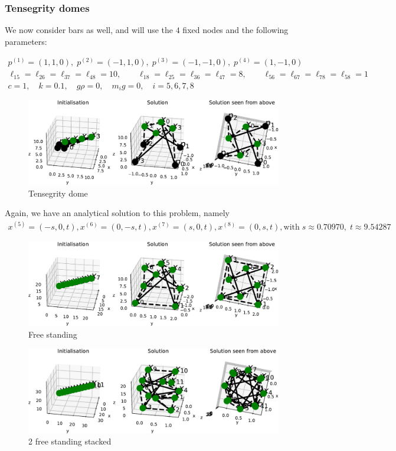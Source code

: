 \subsubsection{Tensegrity domes}
We now consider bars as well, and will use the $4$ fixed nodes and the following parameters:

\begin{equation*}
    \begin{gathered}
    p^{(1)} = (1,1,0),\; p^{(2)} = (-1,1,0),\; p^{(3)} = (-1,-1,0),\; p^{(4)} = (1,-1,0)\\
    \ell_{15} = \ell_{26} = \ell_{37} = \ell_{48} = 10, \qquad \ell_{18} = \ell_{25} = \ell_{36} = \ell_{47} = 8, \qquad \ell_{56} = \ell_{67} = \ell_{78} = \ell_{58} = 1\\
    c=1, \quad k= 0.1, \quad g \rho = 0,\quad m_i g = 0, \quad i = 5,6,7,8
    \end{gathered}
\end{equation*}

\begin{figure}
    \centering
    \includegraphics[width=1\columnwidth]{Bilder/P69.pdf}
    \caption{Tensegrity dome}
    \label{P69}
\end{figure}
Again, we have an analytical solution to this problem, namely 
\begin{equation*}
    \begin{gathered}
    x^{(5)} = (-s,0,t),x^{(6)} = (0,-s,t),x^{(7)} = (s,0,t),x^{(8)} = (0,s,t),  \text{with}\; s \approx 0.70970, \; t \approx 9.54287
    \end{gathered}
\end{equation*}

\begin{figure}
    \centering
    \includegraphics[width=0.95\columnwidth]{Bilder/FREESTANDING.pdf}
    \caption{Free standing}
    \label{fig:freestanding}
\end{figure}

\begin{figure}[!ht]
    \centering
\includegraphics[width=0.95\columnwidth]{Bilder/2FREESTANDING.pdf}
    \caption{2 free standing stacked}
    \label{fig:2freestanding}
\end{figure}


